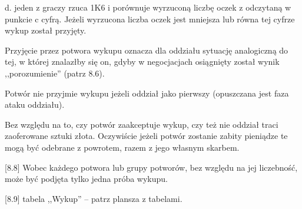 d. jeden z graczy rzuca 1K6 i porównuje wyrzuconą liczbę oczek z odczytaną w punkcie c cyfrą.
Jeżeli wyrzucona liczba oczek jest mniejsza lub równa tej cyfrze wykup został przyjęty.

Przyjęcie przez potwora wykupu oznacza dla oddziału sytuację analogiczną do tej, w której znalazłby się on, gdyby w negocjacjach osiągnięty został wynik ,,porozumienie'' (patrz 8.6).

Potwór nie przyjmie wykupu jeżeli oddział jako pierwszy (opuszczana jest faza ataku oddziału).

Bez względu na to, czy potwór zaakceptuje wykup, czy też nie oddział traci zaoferowane sztuki złota.
Oczywiście jeżeli potwór zostanie zabity pieniądze te mogą być odebrane z powrotem, razem z jego własnym skarbem.

[8.8] Wobec każdego potwora lub grupy potworów, bez względu na jej liczebność, może być podjęta tylko jedna próba wykupu.

[8.9] tabela ,,Wykup'' – patrz plansza z tabelami.